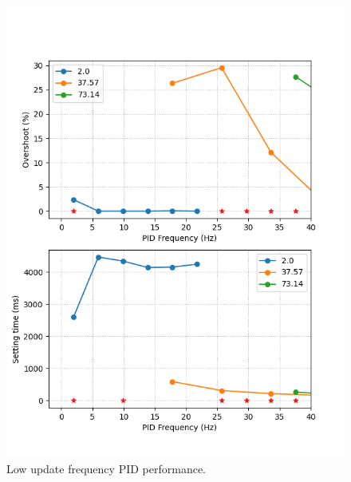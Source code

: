\documentclass[conference]{IEEEtran}
\begin{document}
        \begin{figure}[htbp]
        \centerline{\includegraphics[width=\linewidth]{Report/Pic/ResultLowFrequency_2.png}}
        \caption{Low update frequency PID performance.}
        \label{fig_LowFrequency}
        \end{figure}
\end{document}

